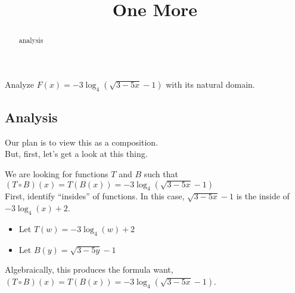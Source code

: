\documentclass{ximera}
\title{One More}
\begin{document}
\begin{abstract}
analysis
\end{abstract}
\maketitle












Analyze $F(x) = -3 \log_4(\sqrt{3 - 5x} - 1)$ with its natural domain. \\




\subsection*{Analysis}





Our plan is to view this as a composition. \\



But, first, let's get a look at this thing. \\



\begin{center}
\end{center}









We are looking for functions $T$ and $B$ such that $(T \circ B)(x) = T(B(x)) = -3 \log_4(\sqrt{3 - 5x} - 1)$ \\


First, identify ``insides'' of functions.  In this case, $\sqrt{3 - 5x} - 1$ is the inside of $-3 \log_4(x) + 2$. \\



\begin{itemize}
\item Let $T(w) = -3 \log_4(w) + 2$ \\
\item Let $B(y) = \sqrt{3 - 5y} - 1$ \\
\end{itemize}

Algebraically, this produces the formula want,  $(T \circ B)(x) = T(B(x)) = -3 \log_4(\sqrt{3 - 5x} - 1)$.
\end{document}
